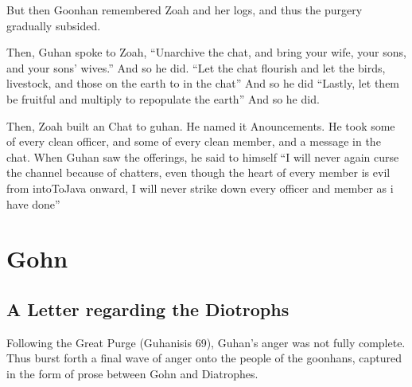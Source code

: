 \documentclass{article}
\begin{document}
But then Goonhan remembered Zoah and her logs, and thus the purgery gradually subsided.

Then, Guhan spoke to Zoah, “Unarchive the chat, and bring your wife, your sons, and your sons’ wives.” And so he did. “Let the chat flourish and let the birds, livestock, and those on the earth to  in the chat” And so he did “Lastly, let them be fruitful and multiply to repopulate the earth” And so he did. %

Then, Zoah built an Chat to guhan. He named it Anouncements. He took some of every clean officer, and some of every clean member, and a message in the chat. When Guhan saw the offerings, he said to himself  “I will never again curse the channel because of chatters, even though the heart of every member is evil from intoToJava onward, I will never strike down every officer and member as i have done” %


\section{Gohn}

\subsection{A Letter regarding the Diotrophs}

Following the Great Purge (Guhanisis 69), Guhan’s anger  was not fully complete. Thus burst forth a final wave of anger onto the people of the goonhans, captured in the form of prose between Gohn and Diatrophes. 
\end{document}
